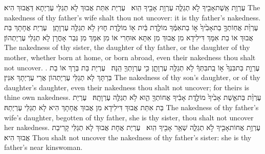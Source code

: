 {עֶרְוַ֥ת אֵֽשֶׁת\maqqaf אָבִ֖יךָ לֹ֣א תְגַלֵּ֑ה עֶרְוַ֥ת אָבִ֖יךָ הִֽוא׃ \setuma }
{עֶרְיַת אִתַּת אֲבוּךְ לָא תְגַלֵּי עֶרְיְתָא דַּאֲבוּךְ הִיא׃}
{The nakedness of thy father’s wife shalt thou not uncover: it is thy father’s nakedness.}{}
{עֶרְוַ֨ת אֲחֽוֹתְךָ֤ בַת\maqqaf אָבִ֙יךָ֙ א֣וֹ בַת\maqqaf אִמֶּ֔ךָ מוֹלֶ֣דֶת בַּ֔יִת א֖וֹ מוֹלֶ֣דֶת ח֑וּץ לֹ֥א תְגַלֶּ֖ה עֶרְוָתָֽן׃ \setuma }
{עֶרְיַת אֲחָתָךְ בַּת אֲבוּךְ אוֹ בַת אִמָּךְ דִּילִידָא מִן אֲבוּךְ מִן אִתָּא אוּחְרִי אוֹ מִן אִמָּךְ מִן גְּבַר אָחֳרָן לָא תְגַלֵּי עֶרְיַתְהוֹן׃}
{The nakedness of thy sister, the daughter of thy father, or the daughter of thy mother, whether born at home, or born abroad, even their nakedness thou shalt not uncover. .}{}
{עֶרְוַ֤ת בַּת\maqqaf בִּנְךָ֙ א֣וֹ בַֽת\maqqaf בִּתְּךָ֔ לֹ֥א תְגַלֶּ֖ה עֶרְוָתָ֑ן כִּ֥י עֶרְוָתְךָ֖ הֵֽנָּה׃ \setuma }
{עֶרְיַת בַּת בְּרָךְ אוֹ בַת בְּרַתָּךְ לָא תְגַלֵּי עֶרְיַתְהוֹן אֲרֵי עֶרְיְתָךְ אִנִּין׃}
{The nakedness of thy son’s daughter, or of thy daughter’s daughter, even their nakedness thou shalt not uncover; for theirs is thine own nakedness.}{}
{עֶרְוַ֨ת בַּת\maqqaf אֵ֤שֶׁת אָבִ֙יךָ֙ מוֹלֶ֣דֶת אָבִ֔יךָ אֲחוֹתְךָ֖ הִ֑וא לֹ֥א תְגַלֶּ֖ה עֶרְוָתָֽהּ׃ \setuma }
{עֶרְיַת בַּת אִתַּת אֲבוּךְ דִּילִידָא מִן אֲבוּךְ אֲחָתָךְ הִיא לָא תְגַלֵּי עֶרְיְתַהּ׃}
{The nakedness of thy father’s wife’s daughter, begotten of thy father, she is thy sister, thou shalt not uncover her nakedness.}{}
{עֶרְוַ֥ת אֲחוֹת\maqqaf אָבִ֖יךָ לֹ֣א תְגַלֵּ֑ה שְׁאֵ֥ר אָבִ֖יךָ הִֽוא׃ \setuma }
{עֶרְיַת אֲחָת אֲבוּךְ לָא תְגַלֵּי קָרִיבַת אֲבוּךְ הִיא׃}
{Thou shalt not uncover the nakedness of thy father’s sister: she is thy father’s near kinswoman.}{}
